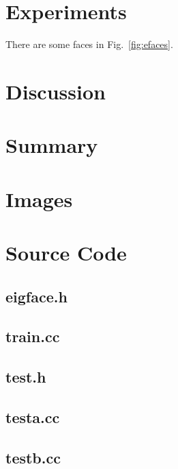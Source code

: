 \section{Experiments}
There are some faces in Fig.~\ref{fig:efaces}.
\section{Discussion}
\section{Summary}

\newpage

\section{Images}



\clearpage

\section{Source Code}
  \subsection{eigface.h}
    
  \subsection{train.cc}
    
  \subsection{test.h}
    
  \subsection{testa.cc}
    
  \subsection{testb.cc}
    
